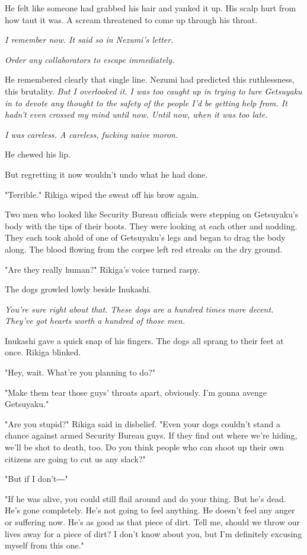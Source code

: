 He felt like someone had grabbed his hair and yanked it up. His scalp
hurt from how taut it was. A scream threatened to come up through his
throat.

\emph{I remember now. It said so in Nezumi's letter.}

\emph{Order any collaborators to escape immediately.}

He remembered clearly that single line. Nezumi had predicted this
ruthlessness, this brutality. \emph{But I overlooked it. I was too caught up
	in trying to lure Getsuyaku in to devote any thought to the safety of
	the people I'd be getting help from. It hadn't even crossed my mind
	until now. Until now, when it was too late.}

\emph{I was careless. A careless, fucking naive moron.}

He chewed his lip.

But regretting it now wouldn't undo what he had done.

"Terrible." Rikiga wiped the sweat off his brow again.

Two men who looked like Security Bureau officials were stepping on
Getsuyaku's body with the tips of their boots. They were looking at each
other and nodding. They each took ahold of one of Getsuyaku's legs and
began to drag the body along. The blood flowing from the corpse left red
streaks on the dry ground.

"Are they really human?" Rikiga's voice turned raspy.

The dogs growled lowly beside Inukashi.

\emph{You're sure right about that. These dogs are a hundred times more
	decent. They've got hearts worth a hundred of those men.}

Inukashi gave a quick snap of his fingers. The dogs all sprang to their
feet at once. Rikiga blinked.

"Hey, wait. What're you planning to do?"

"Make them tear those guys' throats apart, obviously. I'm gonna avenge
Getsuyaku."

"Are you stupid?" Rikiga said in disbelief. "Even your dogs couldn't
stand a chance against armed Security Bureau guys. If they find out
where we're hiding, we'll be shot to death, too. Do you think people who
can shoot up their own citizens are going to cut us any slack?"

"But if I don't―"

"If he was alive, you could still flail around and do your thing. But
he's dead. He's gone completely. He's not going to feel anything. He
doesn't feel any anger or suffering now. He's as good as that piece of
dirt. Tell me, should we throw our lives away for a piece of dirt? I
don't know about you, but I'm definitely excusing myself from this one."


